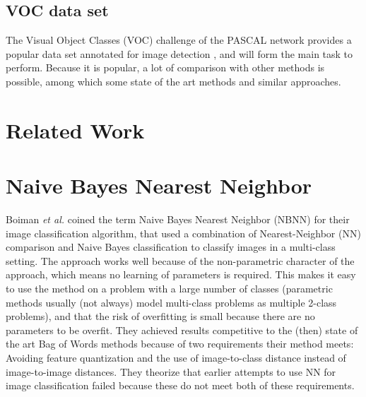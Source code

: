 \documentclass[a4paper,10pt]{article}
\begin{document}
\subsection{VOC data set} %
\label{sub:voc_data_set}
The Visual Object Classes (VOC) challenge of the PASCAL network  provides a popular data set annotated for image detection , and will form the main task to perform. Because it is popular, a lot of comparison with other methods is possible, among which some state of the art methods and similar approaches.



\section{Related Work} %
\label{sec:related_work}

\section{Naive Bayes Nearest Neighbor} %
\label{sec:naive_bayes_nearest_neighbor}

Boiman \emph{et al.} \cite{boiman2008defense} coined the term Naive Bayes Nearest Neighbor (NBNN) for their image classification algorithm, that used a combination of Nearest-Neighbor (NN) comparison and Naive Bayes classification to classify images in a multi-class setting. The approach works well because of the non-parametric character of the approach, which means no learning of parameters is required. This makes it easy to use the method on a problem with a large number of classes (parametric methods usually (not always) model multi-class problems as multiple 2-class problems), and that the risk of overfitting is small because there are no parameters to be overfit. They achieved results competitive to the (then) state of the art Bag of Words methods because of two requirements their method meets: Avoiding feature quantization and the use of image-to-class distance instead of image-to-image distances. They theorize that earlier attempts to use NN  for image classification failed because these do not meet both of these requirements.
\end{document}
